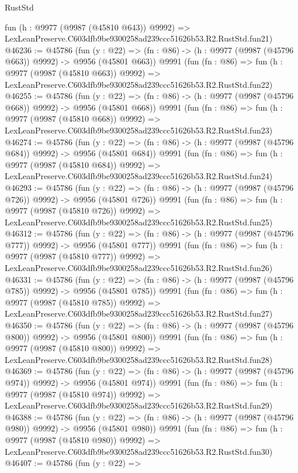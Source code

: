 \begin{lexlean}{RustStd}
\begin{coremodule}
    fun (h : @9977 (@9987 (@45810 @643)) @9992) =>
    LexLeanPreserve.C603dfb9be9300258ad239ccc51626b53.R2.RustStd.fun21)
@46236 := @45786
    (fun (y : @22) => (fn : @86) -> (h : @9977 (@9987 (@45796 @663)) @9992) -> @9956 (@45801 @663))
    @9991
    (fun (fn : @86) =>
    fun (h : @9977 (@9987 (@45810 @663)) @9992) =>
    LexLeanPreserve.C603dfb9be9300258ad239ccc51626b53.R2.RustStd.fun22)
@46255 := @45786
    (fun (y : @22) => (fn : @86) -> (h : @9977 (@9987 (@45796 @668)) @9992) -> @9956 (@45801 @668))
    @9991
    (fun (fn : @86) =>
    fun (h : @9977 (@9987 (@45810 @668)) @9992) =>
    LexLeanPreserve.C603dfb9be9300258ad239ccc51626b53.R2.RustStd.fun23)
@46274 := @45786
    (fun (y : @22) => (fn : @86) -> (h : @9977 (@9987 (@45796 @684)) @9992) -> @9956 (@45801 @684))
    @9991
    (fun (fn : @86) =>
    fun (h : @9977 (@9987 (@45810 @684)) @9992) =>
    LexLeanPreserve.C603dfb9be9300258ad239ccc51626b53.R2.RustStd.fun24)
@46293 := @45786
    (fun (y : @22) => (fn : @86) -> (h : @9977 (@9987 (@45796 @726)) @9992) -> @9956 (@45801 @726))
    @9991
    (fun (fn : @86) =>
    fun (h : @9977 (@9987 (@45810 @726)) @9992) =>
    LexLeanPreserve.C603dfb9be9300258ad239ccc51626b53.R2.RustStd.fun25)
@46312 := @45786
    (fun (y : @22) => (fn : @86) -> (h : @9977 (@9987 (@45796 @777)) @9992) -> @9956 (@45801 @777))
    @9991
    (fun (fn : @86) =>
    fun (h : @9977 (@9987 (@45810 @777)) @9992) =>
    LexLeanPreserve.C603dfb9be9300258ad239ccc51626b53.R2.RustStd.fun26)
@46331 := @45786
    (fun (y : @22) => (fn : @86) -> (h : @9977 (@9987 (@45796 @785)) @9992) -> @9956 (@45801 @785))
    @9991
    (fun (fn : @86) =>
    fun (h : @9977 (@9987 (@45810 @785)) @9992) =>
    LexLeanPreserve.C603dfb9be9300258ad239ccc51626b53.R2.RustStd.fun27)
@46350 := @45786
    (fun (y : @22) => (fn : @86) -> (h : @9977 (@9987 (@45796 @800)) @9992) -> @9956 (@45801 @800))
    @9991
    (fun (fn : @86) =>
    fun (h : @9977 (@9987 (@45810 @800)) @9992) =>
    LexLeanPreserve.C603dfb9be9300258ad239ccc51626b53.R2.RustStd.fun28)
@46369 := @45786
    (fun (y : @22) => (fn : @86) -> (h : @9977 (@9987 (@45796 @974)) @9992) -> @9956 (@45801 @974))
    @9991
    (fun (fn : @86) =>
    fun (h : @9977 (@9987 (@45810 @974)) @9992) =>
    LexLeanPreserve.C603dfb9be9300258ad239ccc51626b53.R2.RustStd.fun29)
@46388 := @45786
    (fun (y : @22) => (fn : @86) -> (h : @9977 (@9987 (@45796 @980)) @9992) -> @9956 (@45801 @980))
    @9991
    (fun (fn : @86) =>
    fun (h : @9977 (@9987 (@45810 @980)) @9992) =>
    LexLeanPreserve.C603dfb9be9300258ad239ccc51626b53.R2.RustStd.fun30)
@46407 := @45786
    (fun (y : @22) =>

\end{coremodule}
\end{lexlean}
